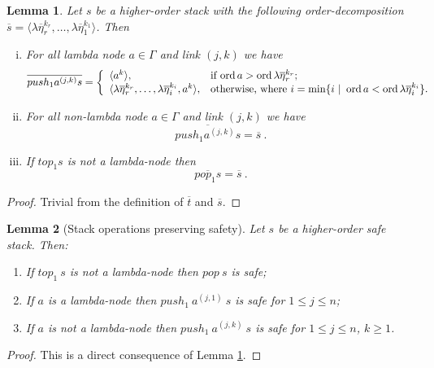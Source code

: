 \documentclass{article}
\newcommand{\ord}{\mathop{\mathrm{ord}}}
\newtheorem{lemma}{Lemma}[section]
\theoremstyle{remark}
\theoremstyle{definition}
\newcommand\orddec\overline
\begin{document}
\begin{lemma}
\label{lem:push1pop1_orderdecompo} Let $s$ be a higher-order stack
with the following order-decomposition $\orddec{s} = \langle \lambda
\overline{\eta}_r^{k_r}, \ldots, \lambda \overline{\eta}_1^{k_1}
\rangle$. Then
\begin{enumerate}[i.]
\item For all lambda node $a \in \Gamma$ and link $(j,k)$ we have
 $$ \orddec{push_1 a^{(j,k)} s} = \left\{
                                       \begin{array}{ll}
                                        \langle a^k \rangle, &  \hbox{if $\ord{a} > \ord{\lambda \overline{\eta}_r^{k_r}}$}; \\
                                         \langle \lambda \overline{\eta}_r^{k_r}, \ldots, \lambda
\overline{\eta}_i^{k_i}, a^k \rangle, & \hbox{otherwise, where $i = \min \{ i \ | \ \ord{a} <
\ord{\lambda \overline{\eta}_i^{k_i}} \}$.}
                                       \end{array}
                                     \right.$$

\item For all non-lambda node $a \in \Gamma$ and link $(j,k)$ we have
$$ \orddec{push_1 a^{(j,k)} s} = \orddec{s} \ .$$

\item If $top_1 s$ is not a lambda-node then
$$ \orddec{pop_1 s} = \orddec{s} \ .$$
\end{enumerate}
\end{lemma}
\begin{proof}
  Trivial from the definition of $\orddec{t}$ and
  $\orddec{s}$.
\end{proof}


\begin{lemma}[Stack operations preserving safety]
\label{lem:push1pop1_preserves_safety} Let $s$ be a higher-order
safe stack. Then:
\begin{enumerate}
  \item If $top_1\ s$ is not a lambda-node then $pop\ s$ is safe;
  \item If $a$ is a lambda-node then $push_1\ a^{(j,1)}\ s$ is safe for $1 \leq j \leq n$;
  \item If $a$ is not a lambda-node then $push_1\ a^{(j,k)}\ s$
is safe for $1 \leq j \leq n$, $k \geq 1$.
\end{enumerate}
\end{lemma}
\begin{proof}
This is a direct consequence of Lemma
\ref{lem:push1pop1_orderdecompo}.
\end{proof}
\end{document}
